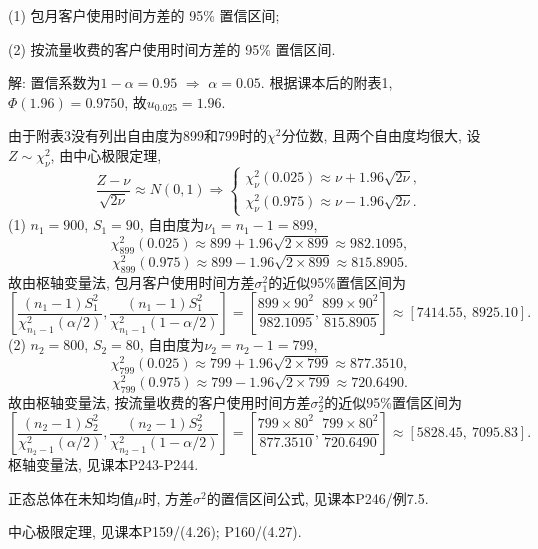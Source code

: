\documentclass[standard]{ExBook}
\renewenvironment{shaded}{%
  \def\FrameCommand{\fboxsep=\FrameSep \colorbox{shadecolor}}%
  \MakeFramed{\advance\hsize-\width \FrameRestore}%
}{%
  \endMakeFramed
}
\begin{document}
\begin{qitems}
\begin{bbox}
\begin{shaded}
(1) 包月客户使用时间方差的 95\% 置信区间;

(2) 按流量收费的客户使用时间方差的 95\% 置信区间.
    \end{shaded}
    \end{bbox}

\vspace{\dimexpr2.5cm-5em\relax}

解: 置信系数为$1-\alpha=0.95$ $\Longrightarrow$ $\alpha=0.05$. 根据课本后的附表1, $\Phi(1.96)=0.9750$, 故$u_{0.025}=1.96$.

由于附表3没有列出自由度为899和799时的$\chi^2$分位数, 且两个自由度均很大, 设$Z\sim\chi_\nu^2$, 由中心极限定理,
$$
\frac{Z-\nu}{\sqrt{2\nu}}\approx N(0,1)
\Longrightarrow
\left\{
\begin{array}{l}
\chi_\nu^2(0.025)\approx\nu+1.96\sqrt{2\nu},\\[0.3em]
\chi_\nu^2(0.975)\approx\nu-1.96\sqrt{2\nu}.
\end{array}
\right.
$$
(1) $n_1=900$, $S_1=90$, 自由度为$\nu_1=n_1-1=899$,
$$
\chi_{899}^2(0.025)
\approx899+1.96\sqrt{2\times899}
\approx982.1095,
$$
$$
\chi_{899}^2(0.975)
\approx899-1.96\sqrt{2\times899}
\approx815.8905.
$$
故由枢轴变量法, 包月客户使用时间方差$\sigma_1^2$的近似95\%置信区间为
$$
\left[
\frac{(n_1-1)S_1^2}{\chi_{n_1-1}^2(\alpha/2)},
\frac{(n_1-1)S_1^2}{\chi_{n_1-1}^2(1-\alpha/2)}
\right]
=
\left[
\frac{899\times90^2}{982.1095},
\frac{899\times90^2}{815.8905}
\right]
\approx[7414.55,\ 8925.10].
$$
(2) $n_2=800$, $S_2=80$, 自由度为$\nu_2=n_2-1=799$,
$$
\chi_{799}^2(0.025)
\approx799+1.96\sqrt{2\times799}
\approx877.3510,
$$
$$
\chi_{799}^2(0.975)
\approx799-1.96\sqrt{2\times799}
\approx720.6490.
$$
故由枢轴变量法, 按流量收费的客户使用时间方差$\sigma_2^2$的近似95\%置信区间为
$$
\left[
\frac{(n_2-1)S_2^2}{\chi_{n_2-1}^2(\alpha/2)},
\frac{(n_2-1)S_2^2}{\chi_{n_2-1}^2(1-\alpha/2)}
\right]
=
\left[
\frac{799\times80^2}{877.3510},
\frac{799\times80^2}{720.6490}
\right]
\approx[5828.45,\ 7095.83].
$$
\textcolor{themeColor}{\selectfont {} 枢轴变量法, 见课本P243-P244.}

\textcolor{themeColor}{\selectfont {}
正态总体在未知均值$\mu$时, 方差$\sigma^2$的置信区间公式, 见课本P246/例7.5.}

\textcolor{themeColor}{\selectfont {}
中心极限定理, 见课本P159/(4.26); P160/(4.27).}

\vspace{2.5cm-5em}


\end{qitems}
\end{document}
